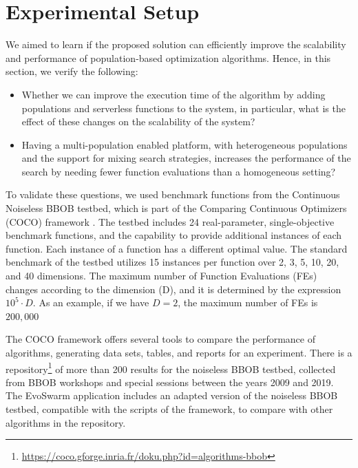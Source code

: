 \documentclass[review]{elsarticle}
\begin{document}
\section{Experimental Setup} 
\label{setup}

We aimed to learn if the proposed solution can efficiently
improve the scalability and performance of population-based optimization
algorithms. Hence, in this section, we verify the following:

\begin{itemize}
 \item Whether we can improve the execution time of the algorithm by adding populations
 and serverless functions to the system, in particular, what is the effect of
 these changes on the scalability of the system? 
 
\item Having a multi-population enabled platform, with heterogeneous populations and
the support for mixing search strategies,  increases the performance of the
search by needing fewer function evaluations than a homogeneous setting?

\end{itemize}


To validate these questions, we used benchmark functions from the Continuous
Noiseless BBOB testbed, which is part of the Comparing Continuous Optimizers
(COCO) framework \cite{hansen2016coco}. The testbed includes 24 real-parameter,
single-objective benchmark functions, and the capability to provide additional
instances of each function. Each instance of a function has a different optimal
value. The standard benchmark of the testbed utilizes 15 instances per function
over 2, 3, 5, 10, 20, and 40 dimensions. The maximum number of Function
Evaluations (FEs) changes according to the dimension (D), and it is determined
by the expression $10^5 \cdot D$. As an example, if we have $D = 2$, the
maximum number of FEs is $200,000$


The COCO framework offers several tools to compare the performance of
algorithms, generating data sets, tables, and reports for an experiment. There
is a repository\footnote{\url{https://coco.gforge.inria.fr/doku.php?id=algorithms-bbob}} 
of more than 200 results for the noiseless BBOB testbed, collected from 
BBOB workshops and special sessions between the years 2009 and 2019. The
EvoSwarm application includes an adapted version of the noiseless BBOB testbed,
compatible with the scripts of the framework, to compare with other algorithms
in the repository.
\end{document}
